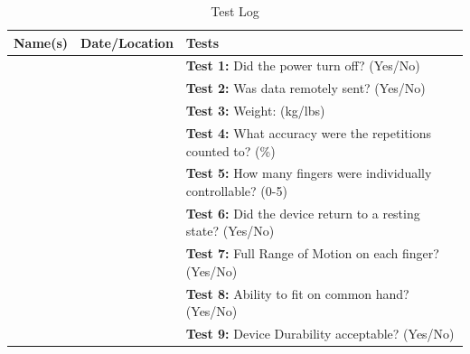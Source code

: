 \documentclass{article}
\begin{document}
\begin{table}[H]
    \hspace*{-1 cm}
    \centering
    \begin{tabular}{|c|c|p{8cm}|}
        \hline
        \textbf{Name(s)} & \textbf{Date/Location} & \textbf{Tests} \\
        \hline
        & & \textbf{Test 1:} Did the power turn off? (Yes/No) \\
        \hline
        & & \textbf{Test 2:} Was data remotely sent? (Yes/No) \\
        \hline
        & & \textbf{Test 3:} Weight: (kg/lbs) \\ 
        \hline
        & & \textbf{Test 4:} What accuracy were the repetitions counted to? (\%) \\
        \hline
        & & \textbf{Test 5:} How many fingers were individually controllable? (0-5) \\
        \hline
        & & \textbf{Test 6:} Did the device return to a resting state? (Yes/No) \\
        \hline
        & & \textbf{Test 7:} Full Range of Motion on each finger? (Yes/No) \\
        \hline
        & & \textbf{Test 8:} Ability to fit on common hand? (Yes/No) \\
        \hline
        & & \textbf{Test 9:} Device Durability acceptable? (Yes/No) \\
        \hline
    \end{tabular}
    \caption{Test Log}
    \label{tab:test_log}
\end{table}
\end{document}
